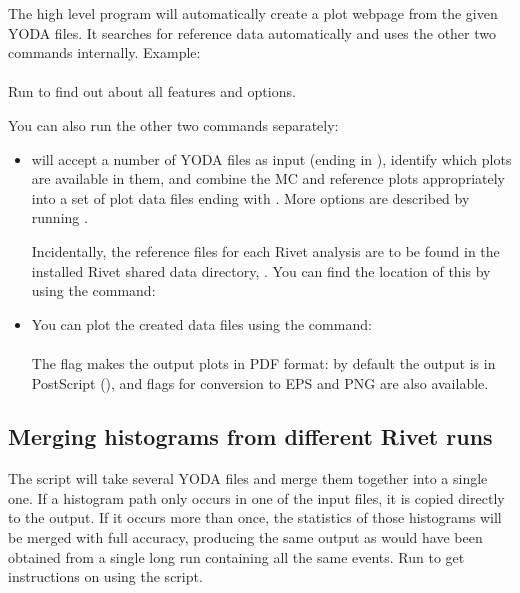 The high level program  will automatically create a plot
webpage from the given YODA files. It searches for reference data automatically
and uses the other two commands internally. Example:\\
\\
Run  to find out about all features and options.

You can also run the other two commands separately:
%
\begin{itemize}
\item {} will accept a number of YODA files as input (ending in
), identify which plots are available in them, and combine the MC
and reference plots appropriately into a set of plot data files ending with
. More options are described by running .

Incidentally, the reference files for each Rivet analysis are to be found in the
installed Rivet shared data directory, . You
can find the location of this by using the  command:\\

\item You can plot the created data files using the  command:\\
\\
The  flag makes the output plots in PDF format: by default the output
is in PostScript (), and flags for conversion to EPS and PNG are also
available.
\end{itemize}


\subsection{Merging histograms from different Rivet runs}
The  script will take several YODA files and merge them together
into a single one. If a histogram path only occurs in one of the input files, it
is copied directly to the output. If it occurs more than once, the statistics of
those histograms will be merged with full accuracy, producing the same output as
would have been obtained from a single long run containing all the same
events. Run  to get instructions on using the script.

